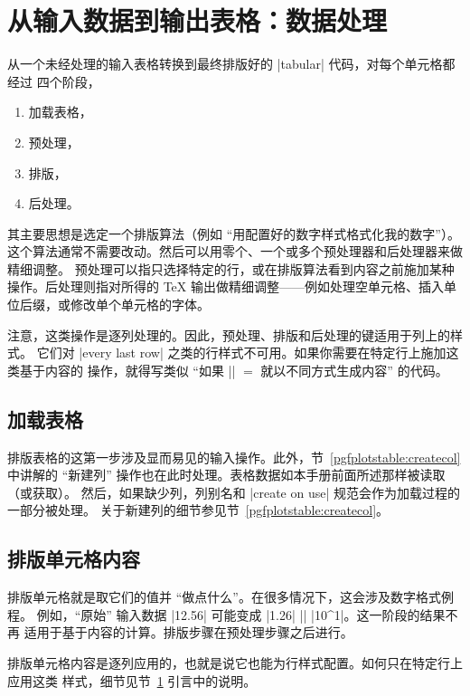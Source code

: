 \documentclass[a4paper,doc2]{ltxdoc}
\begin{document}
\section{从输入数据到输出表格：数据处理}
\label{sec:data:processing}

从一个未经处理的输入表格转换到最终排版好的 |tabular| 代码，对每个单元格都经过
四个阶段，
%
\begin{enumerate}
    \item 加载表格，
    \item 预处理，
    \item 排版，
    \item 后处理。
\end{enumerate}
%
其主要思想是选定一个排版算法（例如 ``用配置好的数字样式格式化我的数字''）。
这个算法通常不需要改动。然后可以用零个、一个或多个预处理器和后处理器来做精细调整。
预处理可以指只选择特定的行，或在排版算法看到内容之前施加某种操作。后处理则指对所得的
\TeX{} 输出做精细调整——例如处理空单元格、插入单位后缀，或修改单个单元格的字体。

注意，这类操作是逐列处理的。因此，预处理、排版和后处理的键适用于列上的样式。
它们对 |every last row| 之类的行样式不可用。如果你需要在特定行上施加这类基于内容的
操作，就得写类似 ``如果 |\pgfplotstablerow| $=$ 就以不同方式生成内容'' 的代码。


\subsection{加载表格}

排版表格的这第一步涉及显而易见的输入操作。此外，节~\ref{pgfplotstable:createcol}
中讲解的 ``新建列'' 操作也在此时处理。表格数据如本手册前面所述那样被读取（或获取）。
然后，如果缺少列，列别名和 |create on use| 规范会作为加载过程的一部分被处理。
关于新建列的细节参见节~\ref{pgfplotstable:createcol}。


\subsection{排版单元格内容}

排版单元格就是取它们的值并 ``做点什么''。在很多情况下，这会涉及数字格式例程。
例如，``原始'' 输入数据 |12.56| 可能变成 |1.26| |\cdot| |10^1|。这一阶段的结果不再
适用于基于内容的计算。排版步骤在预处理步骤之后进行。

排版单元格内容是逐列应用的，也就是说它也能为行样式配置。如何只在特定行上应用这类
样式，细节见节~\ref{sec:data:processing} 引言中的说明。
\end{document}
